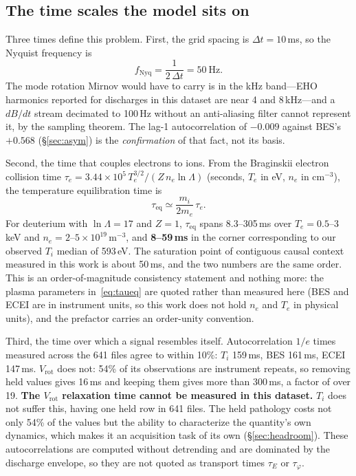 \documentclass[10pt]{article}
\newcommand{\Ti}{\ensuremath{T_i}}
\newcommand{\Vrot}{\ensuremath{V_\mathrm{rot}}}
\begin{document}
\subsection{The time scales the model sits on}
\label{sec:model:scales}

Three times define this problem. First, the grid spacing is $\Delta t = 10$\,ms, so
the Nyquist frequency is
%
\begin{equation}
  f_\mathrm{Nyq} = \frac{1}{2\,\Delta t} = 50~\mathrm{Hz}.
  \label{eq:nyquist}
\end{equation}
%
The mode rotation Mirnov would have to carry is in the kHz band---EHO harmonics
reported for discharges in this dataset are near 4 and 8\,kHz---and a $dB/dt$ stream
decimated to 100\,Hz without an anti-aliasing filter cannot represent it, by the
sampling theorem. The lag-1 autocorrelation of $-0.009$ against BES's $+0.568$
(\S\ref{sec:asym}) is the \emph{confirmation} of that fact, not its basis.

Second, the time that couples electrons to ions. From the Braginskii electron
collision time $\tau_e = 3.44\times10^{5}\,T_e^{3/2}/(Z\,n_e\ln\Lambda)$ (seconds,
$T_e$ in eV, $n_e$ in cm$^{-3}$), the temperature equilibration time is
%
\begin{equation}
  \tau_\mathrm{eq} \simeq \frac{m_i}{2m_e}\,\tau_e .
  \label{eq:taueq}
\end{equation}
%
For deuterium with $\ln\Lambda=17$ and $Z=1$, $\tau_\mathrm{eq}$ spans 8.3--305\,ms
over $T_e=0.5$--3\,keV and $n_e=2$--$5\times10^{19}$\,m$^{-3}$, and
\textbf{8--59\,ms} in the corner corresponding to our observed \Ti{} median of
593\,eV. The saturation point of contiguous causal context measured in this work is
about 50\,ms, and the two numbers are the same order. This is an order-of-magnitude
consistency statement and nothing more: the plasma parameters in~\eqref{eq:taueq} are
quoted rather than measured here (BES and ECEI are in instrument units, so this work
does not hold $n_e$ and $T_e$ in physical units), and the prefactor carries an
order-unity convention.

Third, the time over which a signal resembles itself. Autocorrelation $1/e$ times
measured across the 641 files agree to within 10\%: \Ti{} 159\,ms, BES 161\,ms, ECEI
147\,ms. \Vrot{} does not: 54\% of its observations are instrument repeats, so
removing held values gives 16\,ms and keeping them gives more than 300\,ms, a factor
of over 19. \textbf{The \Vrot{} relaxation time cannot be measured in this dataset.}
\Ti{} does not suffer this, having one held row in 641 files. The held pathology costs
not only 54\% of the values but the ability to characterize the quantity's own
dynamics, which makes it an acquisition task of its own (\S\ref{sec:headroom}). These autocorrelations are computed without
detrending and are dominated by the discharge envelope, so they are not quoted as
transport times $\tau_E$ or $\tau_\varphi$.
\end{document}
